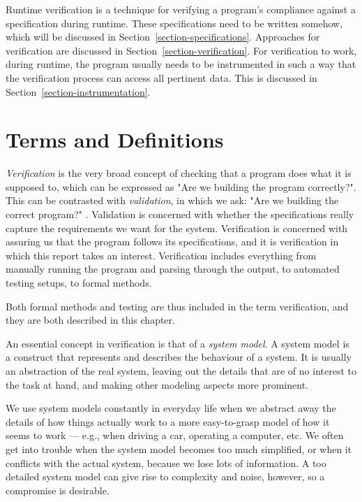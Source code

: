 \documentclass[a4paper,11pt]{kth-mag}
\begin{document}
Runtime verification is a technique for verifying a program's compliance
against a specification during runtime. These specifications need to be written
somehow, which will be discussed in Section~\ref{section-specifications}.
Approaches for verification are discussed in
Section~\ref{section-verification}. For verification to work, during runtime,
the program usually needs to be instrumented in such a way that the
verification process can access all pertinent data. This is discussed in
Section~\ref{section-instrumentation}.


\section{Terms and Definitions}
\label{section-background-definitions}
\label{section-definition-verification}
\label{section-system-model}

\textit{Verification} is the very broad concept of checking that a program does
what it is supposed to, which can be expressed as "Are we building the program
correctly?". This can be contrasted with \textit{validation}, in which we ask:
"Are we building the correct program?" \cite{boehm81engineeringeconomics}.
Validation is concerned with whether the specifications really capture the
requirements we want for the system. Verification is concerned with assuring us
that the program follows its specifications, and it is verification in which
this report takes an interest. Verification includes everything from manually
running the program and parsing through the output, to automated testing
setups, to formal methods.

Both formal methods and testing are thus included in the term verification, and
they are both described in this chapter.

An essential concept in verification is that of a \textit{system model}. A
system model is a construct that represents and describes the behaviour of a
system. It is usually an abstraction of the real system, leaving out the
details that are of no interest to the task at hand, and making other modeling
aspects more prominent.

We use system models constantly in everyday life when we abstract away the
details of how things actually work to a more easy-to-grasp model of how it
seems to work --- e.g., when driving a car, operating a computer, etc. We often
get into trouble when the system model becomes too much simplified, or when it
conflicts with the actual system, because we lose lots of information. A too
detailed system model can give rise to complexity and noise, however, so a
compromise is desirable.
\end{document}

